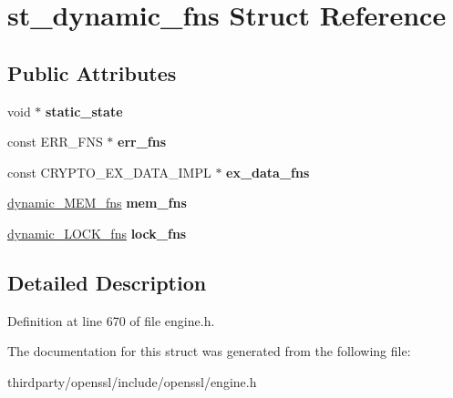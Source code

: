 \hypertarget{structst__dynamic__fns}{}\section{st\+\_\+dynamic\+\_\+fns Struct Reference}
\label{structst__dynamic__fns}
\subsection*{Public Attributes}
\begin{DoxyCompactItemize}
\item 
\mbox{\label{structst__dynamic__fns_abaade597a7f70ea7b75c4ad2f656fb92}} 
void $\ast$ {\bfseries static\+\_\+state}
\item 
\mbox{\label{structst__dynamic__fns_a01d513d12727c5a3f86e6b7370476197}} 
const E\+R\+R\+\_\+\+F\+NS $\ast$ {\bfseries err\+\_\+fns}
\item 
\mbox{\label{structst__dynamic__fns_abf1fdf43c6222c63ea213bddd9163886}} 
const C\+R\+Y\+P\+T\+O\+\_\+\+E\+X\+\_\+\+D\+A\+T\+A\+\_\+\+I\+M\+PL $\ast$ {\bfseries ex\+\_\+data\+\_\+fns}
\item 
\mbox{\label{structst__dynamic__fns_a337f97c16bdfd0bbe3e4432fa32b29c4}} 
\hyperlink{structst__dynamic___m_e_m__fns}{dynamic\+\_\+\+M\+E\+M\+\_\+fns} {\bfseries mem\+\_\+fns}
\item 
\mbox{\label{structst__dynamic__fns_a95857186710500c6c349a79f22ac5b05}} 
\hyperlink{structst__dynamic___l_o_c_k__fns}{dynamic\+\_\+\+L\+O\+C\+K\+\_\+fns} {\bfseries lock\+\_\+fns}
\end{DoxyCompactItemize}


\subsection{Detailed Description}


Definition at line 670 of file engine.\+h.



The documentation for this struct was generated from the following file\+:\begin{DoxyCompactItemize}
\item 
thirdparty/openssl/include/openssl/engine.\+h\end{DoxyCompactItemize}
